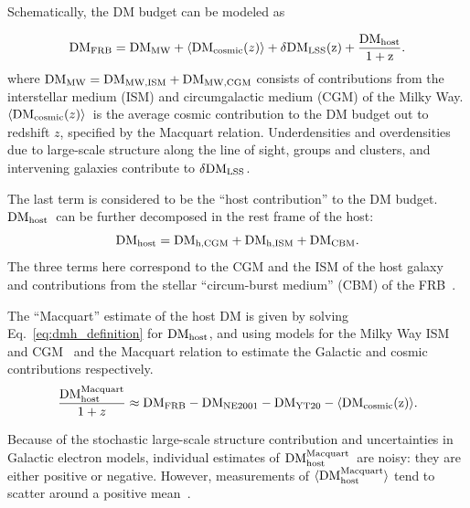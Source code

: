 \documentclass[twocolumn,linenumbers]{aastex631}
\newcommand{\dm}{\ensuremath{\rm DM}}
\newcommand{\dmmw}{\ensuremath{{\rm DM}_\textrm{MW}}}
\newcommand{\dmmwism}{\ensuremath{{\rm DM}_\textrm{MW,ISM}}}
\newcommand{\dmmwcgm}{\ensuremath{{\rm DM}_\textrm{MW,CGM}}}
\newcommand{\avgdmcosmic}{\ensuremath{\langle {\rm DM}_{\rm cosmic}(z) \rangle}}
\newcommand{\dmh}{\ensuremath{{\rm DM}_\textrm{host}}}
\newcommand{\dmhm}{\ensuremath{{\rm DM}_\textrm{host}^\textrm{Macquart}}}
\newcommand{\dmhism}{\ensuremath{{\rm DM}_\textrm{h,ISM}}}
\newcommand{\dmhcgm}{\ensuremath{{\rm DM}_\textrm{h,CGM}}}
\newcommand{\dmhcbm}{\ensuremath{{\rm DM}_\textrm{CBM}}}
\newcommand{\dmtot}{\ensuremath{{\rm DM}_\textrm{FRB}}} %
\begin{document}
Schematically, the DM budget can be modeled as 

\begin{equation}
\dmtot = \dmmw + \avgdmcosmic + \delta\dm_{LSS}(z) + \dfrac{\dmh}{1 + z}.
\label{eq:dmh_definition}
\end{equation}
where $\dmmw=\dmmwism + \dmmwcgm$ consists of contributions from the interstellar medium (ISM) and circumgalactic medium (CGM) of the Milky Way. \avgdmcosmic~is the average cosmic contribution to the DM budget out to redshift $z$, specified by the Macquart relation. Underdensities and overdensities due to large-scale structure along the line of sight, groups and clusters, and intervening galaxies contribute to $\delta\dm_{LSS}$. 

The last term is considered to be the ``host contribution'' to the DM budget. \dmh~can be further decomposed in the rest frame of the host:
\begin{equation}
    \dmh = \dmhcgm + \dmhism + \dmhcbm.
    \label{eq:dmh_contributions}
\end{equation}
The three terms here correspond to the CGM and the ISM of the host galaxy and contributions from the stellar ``circum-burst medium'' (CBM) of the FRB~\citep[see e.g.][]{tendulkar2017host, niu2021repeating,ocker2022large,caleb2023subarc}. 

The ``Macquart'' estimate of the host DM is given by solving Eq.~\ref{eq:dmh_definition} for \dmh, and using models for the Milky Way ISM~\citep{cordes2002ne2001} and CGM~\citep{yamasaki2020galactic} and the Macquart relation to estimate the Galactic and cosmic contributions respectively. 
\begin{equation}
\dfrac{\dmhm}{1+z} \approx \dmtot - \dm_\mathrm{NE2001} - \dm_\mathrm{YT20} - \avgdmcosmic.
\end{equation}

Because of the stochastic large-scale structure contribution and uncertainties in Galactic electron models, individual estimates of \dmhm\ are noisy: they are either positive or negative. However, measurements of $\langle \dmhm \rangle$ tend to scatter around a positive mean~\citep{shannon2018dispersion,macquart2020census,james2022fast,shin2023inferring,bernalescortes2025empirical}.

\end{document}
